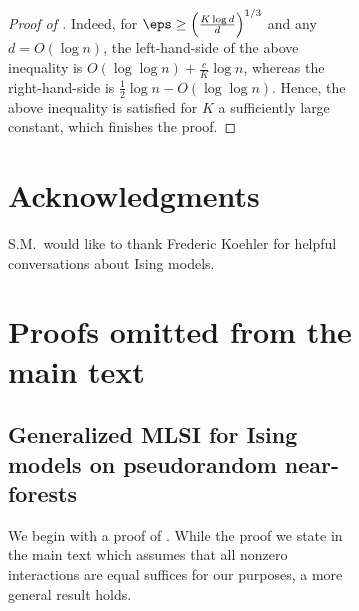 \documentclass[11pt,letterpaper]{article}
\begin{document}
\begin{figure}
\begin{figure}
\begin{proof}[Proof of ]
    Indeed, for $\eps \ge \left(\frac{K \log d}{d}\right)^{1/3}$ and any $d = O(\log n)$, the left-hand-side of the above inequality is $O(\log\log n) + \frac{c}{K} \log n$, whereas the right-hand-side is $\frac{1}{2}\log n - O(\log \log n)$. 
    Hence, the above inequality is satisfied for $K$ a sufficiently large constant, which finishes the proof.  
\end{proof}

\section*{Acknowledgments}
S.M.\ would like to thank Frederic Koehler for helpful conversations about Ising models.

\clearpage





\appendix

\section{Proofs omitted from the main text}
\label{appendix-a}

\subsection{Generalized MLSI for Ising models on pseudorandom near-forests}

We begin with a proof of . While the proof we state in the main text which assumes that all nonzero interactions are equal suffices for our purposes, a more general result holds.

\pseudorandomferromixing*


\end{figure}
\end{figure}
\end{document}
